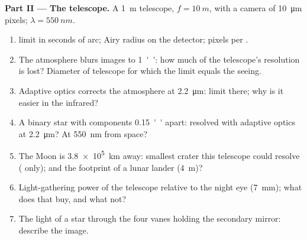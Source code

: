 \begin{problem}
\medskip
\noindent\textbf{Part II --- The telescope.}
A \qty{1}{m} telescope, $f = \qty{10}{m}$, with a camera of \qty{10}{\micro m}
pixels; $\lambda = \qty{550}{nm}$.
\begin{enumerate}[resume]
  \item {} limit in seconds of arc; Airy radius on the
        detector; pixels per .
  \item The atmosphere blurs images to \qty{1}{''}: how much of the
        telescope's resolution is lost? Diameter of telescope for which
        the  limit equals the seeing.
  \item Adaptive optics corrects the atmosphere at \qty{2.2}{\micro m}:
         limit there; why is it easier in the infrared?
  \item A binary star with components \qty{0.15}{''} apart: resolved with
        adaptive optics at \qty{2.2}{\micro m}? At \qty{550}{nm} from space?
  \item The Moon is \qty{3.8e5}{km} away: smallest crater this telescope
        could resolve ( only); and the footprint of a lunar
        lander (\qty{4}{m})?
  \item Light-gathering power of the telescope relative to the
        night eye (\qty{7}{mm}); what does that buy, and what not?
  \item The light of a star through the four vanes holding the
        secondary mirror: describe the image.
\end{enumerate}


\end{problem}
